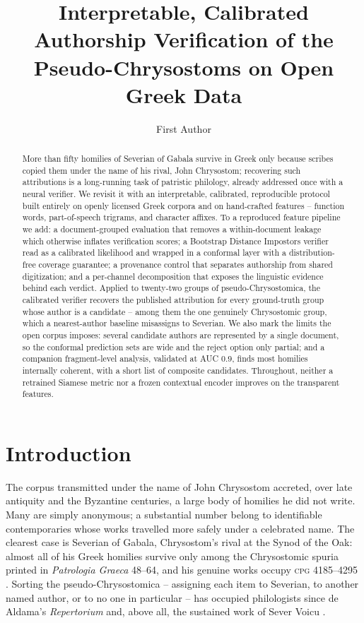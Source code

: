 \documentclass{anthology-ch}
\title{Interpretable, Calibrated Authorship Verification of the Pseudo-Chrysostoms on Open Greek Data}
\author[1]{First Author}[
  orcid=
]
\affiliation{1}{Department, University, City, Country}
\begin{document}
\maketitle

\begin{abstract}
More than fifty homilies of Severian of Gabala survive in Greek only because scribes copied them under the name of his rival, John Chrysostom; recovering such attributions is a long-running task of patristic philology, already addressed once with a neural verifier. We revisit it with an interpretable, calibrated, reproducible protocol built entirely on openly licensed Greek corpora and on hand-crafted features -- function words, part-of-speech trigrams, and character affixes. To a reproduced feature pipeline we add: a document-grouped evaluation that removes a within-document leakage which otherwise inflates verification scores; a Bootstrap Distance Impostors verifier read as a calibrated likelihood and wrapped in a conformal layer with a distribution-free coverage guarantee; a provenance control that separates authorship from shared digitization; and a per-channel decomposition that exposes the linguistic evidence behind each verdict. Applied to twenty-two groups of pseudo-Chrysostomica, the calibrated verifier recovers the published attribution for every ground-truth group whose author is a candidate -- among them the one genuinely Chrysostomic group, which a nearest-author baseline misassigns to Severian. We also mark the limits the open corpus imposes: several candidate authors are represented by a single document, so the conformal prediction sets are wide and the reject option only partial; and a companion fragment-level analysis, validated at AUC $0.9$, finds most homilies internally coherent, with a short list of composite candidates. Throughout, neither a retrained Siamese metric nor a frozen contextual encoder improves on the transparent features.
\end{abstract}

\section{Introduction}

The corpus transmitted under the name of John Chrysostom accreted, over late antiquity and the Byzantine centuries, a large body of homilies he did not write. Many are simply anonymous; a substantial number belong to identifiable contemporaries whose works travelled more safely under a celebrated name. The clearest case is Severian of Gabala, Chrysostom's rival at the Synod of the Oak: almost all of his Greek homilies survive only among the Chrysostomic spuria printed in \emph{Patrologia Graeca} 48--64, and his genuine works occupy \textsc{cpg} 4185--4295 \cite{cpg,severian_wiki}. Sorting the pseudo-Chrysostomica -- assigning each item to Severian, to another named author, or to no one in particular -- has occupied philologists since de Aldama's \emph{Repertorium} \cite{dealdama1965} and, above all, the sustained work of Sever Voicu \cite{voicu}.
\end{document}
